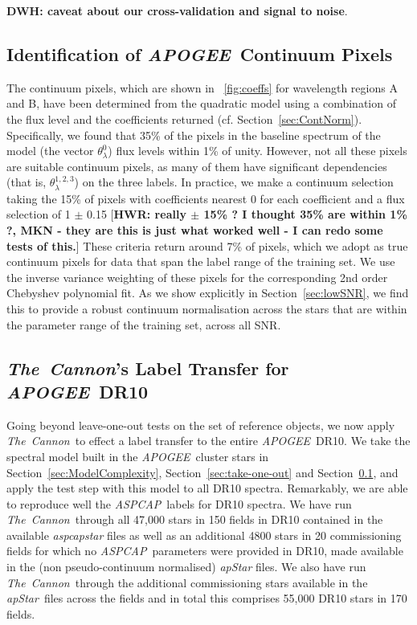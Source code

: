 \documentclass[12pt, preprint]{aastex}
\newcommand{\sectionname}{Section}
\newcommand{\tc}{\textsl{The~Cannon}}
\newcommand{\apogee}{\textsl{APOGEE}}
\newcommand{\aspcap}{\textsl{ASPCAP}}
\newcommand{\apstar}{\textsl{apStar}}
\begin{document}
\textbf{DWH: caveat about our cross-validation and signal to noise}. 

\subsection{Identification of \apogee\ Continuum Pixels}
\label{sec:ApogeeContinuum}

The continuum pixels, which are shown in \figurename~\ref{fig:coeffs} for wavelength regions A and B, 
have been determined from the quadratic model using a combination of the flux level and the coefficients returned
(cf. \sectionname~\ref{sec:ContNorm}). Specifically, we found that 35\% of the pixels in the baseline spectrum of the model (the vector $\theta^0_\lambda$) flux levels within 1\% of unity. However, not all these pixels are suitable continuum pixels, as many of them have significant dependencies (that is, $\theta^{1,2,3}_\lambda$)
on the three labels. 
In practice, we make a continuum selection taking the 15\% of pixels with coefficients nearest 0 for each coefficient and a flux selection of 1 $\pm$ 0.15 [{\bf HWR: really $\pm$ 15\% ? I thought 35\% are within 1\% ?, MKN - they are this is just what worked well - I can redo some tests of this.}]
These criteria return around 7\% of pixels, which we adopt as true continuum pixels for data that span the label range of the training set. We use the inverse variance weighting of these pixels for the corresponding 2nd order Chebyshev polynomial fit. 
As we show explicitly in \sectionname~\ref{sec:lowSNR}, we find this to provide a robust continuum normalisation across the stars that are within the parameter range of the training set, 
across all SNR. 

\subsection{\tc 's Label Transfer for \apogee\ DR10}
\label{sec:APOGEE_DR10_comparison}

Going beyond leave-one-out tests on the set of reference objects, we now apply \tc\ to effect a label transfer to the entire \apogee\ DR10.
We take the spectral model built in the \apogee\ cluster stars in \sectionname~\ref{sec:ModelComplexity}, \sectionname~\ref{sec:take-one-out} and \sectionname~\ref{sec:ApogeeContinuum},
and apply the test step with this model to all DR10 spectra.
Remarkably, we are able to reproduce well the \aspcap\ labels for DR10 spectra. We have run \tc\ through all 47,000 stars in 150 fields in DR10 contained in the available \textit{aspcapstar} files as well as an additional 4800 stars in 20 commissioning fields for which no \aspcap\ parameters were provided in DR10, 
made available in the (non pseudo-continuum normalised) \textit{apStar} files. 
We also have run \tc\ through the additional commissioning stars available in the \apstar\ files across the fields and in total this
 comprises 55,000 DR10 stars in 170 fields. %
\end{document}
